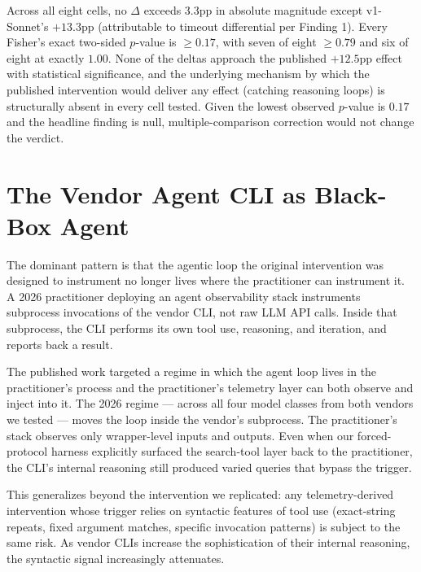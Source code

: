\documentclass[journal]{IEEEtran}
\begin{document}
Across all eight cells, no $\Delta$ exceeds 3.3pp in absolute magnitude except v1-Sonnet's $+13.3$pp (attributable to timeout differential per Finding 1). Every Fisher's exact two-sided $p$-value is $\geq 0.17$, with seven of eight $\geq 0.79$ and six of eight at exactly $1.00$. None of the deltas approach the published $+12.5$pp effect with statistical significance, and the underlying mechanism by which the published intervention would deliver any effect (catching reasoning loops) is structurally absent in every cell tested. Given the lowest observed $p$-value is $0.17$ and the headline finding is null, multiple-comparison correction would not change the verdict.

\section{The Vendor Agent CLI as Black-Box Agent}

The dominant pattern is that the agentic loop the original intervention was designed to instrument no longer lives where the practitioner can instrument it. A 2026 practitioner deploying an agent observability stack instruments subprocess invocations of the vendor CLI, not raw LLM API calls. Inside that subprocess, the CLI performs its own tool use, reasoning, and iteration, and reports back a result.

The published work targeted a regime in which the agent loop lives in the practitioner's process and the practitioner's telemetry layer can both observe and inject into it. The 2026 regime --- across all four model classes from both vendors we tested --- moves the loop inside the vendor's subprocess. The practitioner's stack observes only wrapper-level inputs and outputs. Even when our forced-protocol harness explicitly surfaced the search-tool layer back to the practitioner, the CLI's internal reasoning still produced varied queries that bypass the trigger.

This generalizes beyond the intervention we replicated: any telemetry-derived intervention whose trigger relies on syntactic features of tool use (exact-string repeats, fixed argument matches, specific invocation patterns) is subject to the same risk. As vendor CLIs increase the sophistication of their internal reasoning, the syntactic signal increasingly attenuates.

\end{document}
